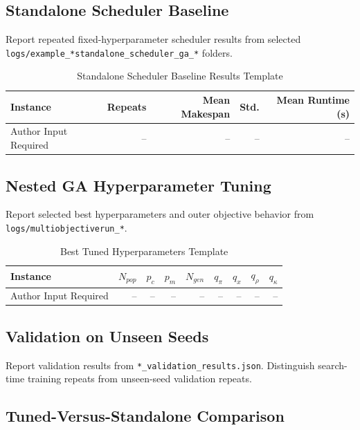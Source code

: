 \documentclass{ieeeaccess}
\begin{document}
\subsection{Standalone Scheduler Baseline}

Report repeated fixed-hyperparameter scheduler results from selected \texttt{logs/example\_*standalone\_scheduler\_ga\_*} folders.

\begin{table}[t]
\caption{Standalone Scheduler Baseline Results Template}
\label{tab:standalone_results}
\centering
\begin{tabular}{lrrrr}
\toprule
Instance & Repeats & Mean Makespan & Std. & Mean Runtime (s) \\
\midrule
Author Input Required & -- & -- & -- & -- \\
\bottomrule
\end{tabular}
\end{table}

\subsection{Nested GA Hyperparameter Tuning}

Report selected best hyperparameters and outer objective behavior from \texttt{logs/multiobjectiverun\_*}.

\begin{table}[t]
\caption{Best Tuned Hyperparameters Template}
\label{tab:best_hyperparameters}
\centering
\begin{tabular}{lrrrrrrrr}
\toprule
Instance & \(N_{pop}\) & \(p_c\) & \(p_m\) & \(N_{gen}\) & \(q_{\pi}\) & \(q_x\) & \(q_{\rho}\) & \(q_{\kappa}\) \\
\midrule
Author Input Required & -- & -- & -- & -- & -- & -- & -- & -- \\
\bottomrule
\end{tabular}
\end{table}

\subsection{Validation on Unseen Seeds}

Report validation results from \texttt{*\_validation\_results.json}. Distinguish search-time training repeats from unseen-seed validation repeats.

\subsection{Tuned-Versus-Standalone Comparison}
\end{document}
